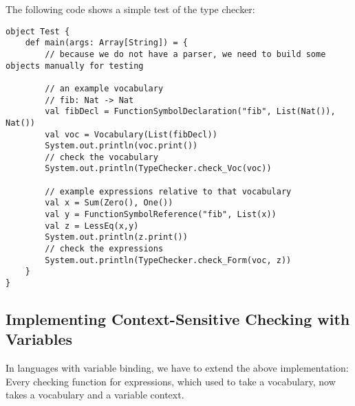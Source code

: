 The following code shows a simple test of the type checker:
\begin{lstlisting}
object Test {
    def main(args: Array[String]) = {
        // because we do not have a parser, we need to build some objects manually for testing
        
        // an example vocabulary
        // fib: Nat -> Nat
        val fibDecl = FunctionSymbolDeclaration("fib", List(Nat()), Nat())
        val voc = Vocabulary(List(fibDecl))
        System.out.println(voc.print()) 
        // check the vocabulary
        System.out.println(TypeChecker.check_Voc(voc))  

        // example expressions relative to that vocabulary
        val x = Sum(Zero(), One())
        val y = FunctionSymbolReference("fib", List(x))
        val z = LessEq(x,y)
        System.out.println(z.print())
        // check the expressions      
        System.out.println(TypeChecker.check_Form(voc, z))
    }
}
\end{lstlisting}

\subsection{Implementing Context-Sensitive Checking with Variables}

In languages with variable binding, we have to extend the above implementation: Every checking function for expressions, which used to take a vocabulary, now takes a vocabulary and a variable context.
